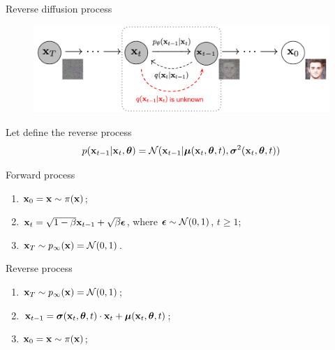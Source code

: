 \begin{frame}{Reverse diffusion process}
	\begin{figure}
		\includegraphics[width=0.8\linewidth]{figs/DDPM}
	\end{figure}
	Let define the reverse process
	\vspace{-0.2cm}
	\[
		p(\mathbf{x}_{t - 1} | \mathbf{x}_t, \boldsymbol{\theta}) = \mathcal{N}(\mathbf{x}_{t - 1} | \boldsymbol{\mu}(\mathbf{x}_t, \boldsymbol{\theta}, t), \boldsymbol{\sigma}^2(\mathbf{x}_t, \boldsymbol{\theta}, t))
	\]
	\vspace{-0.5cm}
	\begin{minipage}{0.5\linewidth}
		\begin{block}{Forward process}
			\begin{enumerate}
				\item $\mathbf{x}_0 = \mathbf{x} \sim \pi(\mathbf{x})$;
				\item $\mathbf{x}_t = \sqrt{1 - \beta} \mathbf{x}_{t - 1} + \sqrt{\beta} \boldsymbol{\epsilon}$, where $\boldsymbol{\epsilon} \sim \mathcal{N}(0, 1)$, $t \geq 1$;
				\item $\mathbf{x}_T \sim p_{\infty}(\mathbf{x}) = \mathcal{N}(0, 1)$.
			\end{enumerate}
		\end{block}
	\end{minipage}%
	\begin{minipage}{0.5\linewidth}
		\begin{block}{Reverse process}
			\begin{enumerate}
				\item $\mathbf{x}_T \sim p_{\infty}(\mathbf{x}) = \mathcal{N}(0, 1)$;
				\item $\mathbf{x}_{t - 1} = \boldsymbol{\sigma}(\mathbf{x}_t, \boldsymbol{\theta}, t) \cdot \mathbf{x}_t + \boldsymbol{\mu}(\mathbf{x}_t, \boldsymbol{\theta}, t)$;
				\item $\mathbf{x}_0 = \mathbf{x} \sim \pi(\mathbf{x})$;
			\end{enumerate}
		\end{block}
	\end{minipage}
\end{frame}
